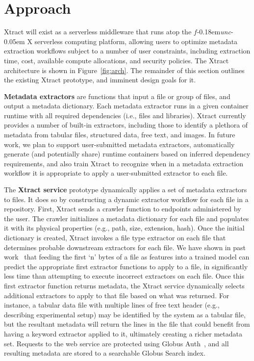 \documentclass[sigconf, 9pt]{acmart}
\newcommand{\name}{Xtract}
\newcommand{\funcx}{$f$\kern-0.18em\emph{unc}\kern-0.05em X}
\begin{document}
\section{Approach}
\label{sec:approach}

\name{} will exist as a serverless middleware that runs atop the \funcx{} serverless 
computing platform, allowing users to optimize metadata extraction workflows subject to 
a number of user constraints, including extraction time, cost, available compute allocations, and security policies.
The \name{} architecture is shown in Figure~\ref{fig:arch}.
The remainder 
of this section outlines the existing \name{} prototype, and imminent design goals for it.  

\textbf{Metadata extractors} are functions that input a file or group of files, and output a metadata dictionary. 
Each metadata extractor runs in a given container runtime with all required dependencies (i.e., files and 
libraries).  \name{} currently provides a number of built-in extractors, including
those to identify a plethora of metadata from tabular files, structured data, free text, and images. In future work, 
we plan to support user-submitted metadata extractors, automatically generate (and potentially share) runtime containers based on inferred 
dependency requirements, and also train \name{} to recognize when in a metadata extraction workflow it is appropriate to apply a user-submitted extractor 
to each file. 

The \textbf{\name{} service} prototype dynamically applies a set of metadata extractors to files. 
It does so by constructing a dynamic extractor workflow for each file in a repository.  
First, \name{} sends a crawler function to endpoints administered by the user.  The crawler initializes a metadata dictionary for each file and populates it with
its physical properties (e.g., path, size, extension, hash).  Once the initial dictionary is created, \name{} invokes a file type extractor on each file that determines probable downstream extractors for each file. We have shown in past work~\cite{skluzacek2018skluma} that feeding the first `n' bytes of a file as features into 
a trained model can predict the appropriate first extractor functions to apply to a file, in significantly less time
than attempting to execute incorrect extractors on each file. Once this first extractor function returns metadata, the \name{} service dynamically selects additional extractors to apply to 
that file based on what was returned.  For instance, 
a tabular data file with multiple lines of free text header (e.g., describing experimental setup) may be identified by the system as a tabular file, but 
the resultant metadata will return the lines in the file that could benefit from having a keyword extractor applied to it, ultimately creating a richer metadata set.
Requests to the web service are protected using Globus Auth~\cite{tuecke2016globus}, and all resulting metadata are stored to a searchable Globus Search index. 
\end{document}
